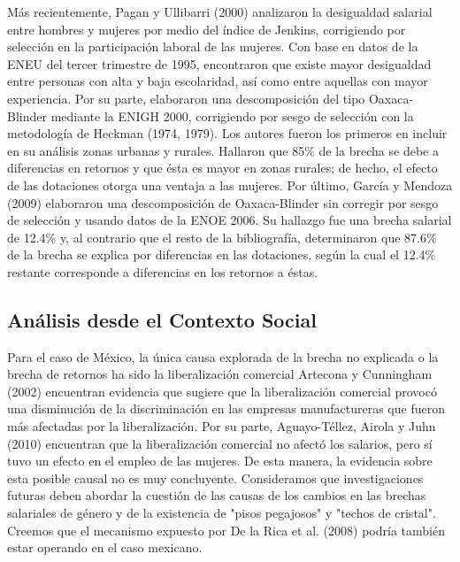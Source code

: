 M\'as recientemente, Pagan y Ullibarri (2000) analizaron la desigualdad salarial entre hombres y mujeres por medio del \'indice de Jenkins, corrigiendo por selecci\'on en la participaci\'on laboral de las mujeres. Con base en datos de la ENEU del tercer trimestre de 1995, encontraron que existe mayor desigualdad entre personas con alta y baja escolaridad, as\'i como entre aquellas con mayor experiencia. Por su parte, elaboraron una descomposici\'on del tipo Oaxaca-Blinder mediante la ENIGH 2000, corrigiendo por sesgo de selecci\'on con la metodolog\'ia de Heckman (1974, 1979). Los autores fueron los primeros en incluir en su an\'alisis zonas urbanas y rurales. Hallaron que 85\% de la brecha se debe a diferencias en retornos y que \'esta es mayor en zonas rurales; de hecho, el efecto de las dotaciones otorga una ventaja a las mujeres. Por \'ultimo, Garc\'ia y Mendoza (2009) elaboraron una descomposici\'on de Oaxaca-Blinder sin corregir por sesgo de selecci\'on y usando datos de la ENOE 2006. Su hallazgo fue una brecha salarial de 12.4\% y, al contrario que el resto de la bibliograf\'ia, determinaron que 87.6\% de la brecha se explica por diferencias en las dotaciones, seg\'un la cual el 12.4\% restante corresponde a diferencias en los retornos a \'estas.

\subsection{An\'alisis desde el Contexto Social}
Para el caso de M\'exico, la \'unica causa explorada de la brecha no explicada o la brecha de retornos ha sido la liberalizaci\'on comercial Artecona y Cunningham (2002) encuentran evidencia que sugiere que la liberalizaci\'on comercial provoc\'o una disminuci\'on de la discriminaci\'on en las empresas manufactureras que fueron más afectadas por la liberalizaci\'on. Por su parte, Aguayo-T\'ellez, Airola y Juhn (2010) encuentran que la liberalizaci\'on comercial no afect\'o los salarios, pero s\'i tuvo un efecto en el empleo de las mujeres. De esta manera, la evidencia sobre esta posible causal no es muy concluyente. Consideramos que investigaciones futuras deben abordar la cuesti\'on de las causas de los cambios en las brechas salariales de g\'enero y de la existencia de "pisos pegajosos" y "techos de cristal". Creemos que el mecanismo expuesto por De la Rica et al. (2008) podr\'ia tambi\'en estar operando en el caso mexicano. 

